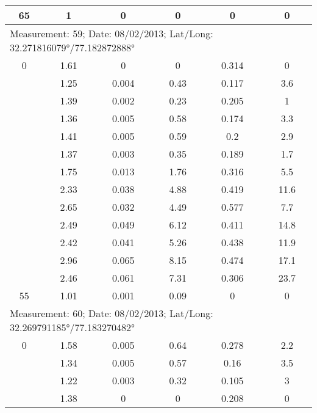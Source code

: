 \begin{longtable}{cccccc}
		65    & 1     & 0     & 0     & 0     & 0 \\
		\midrule
		\multicolumn{6}{l}{Measurement: 59; Date: 08/02/2013;
			Lat/Long: 32.271816079°/77.182872888°} \\		
		\midrule
		0     & 1.61  & 0     & 0     & 0.314 & 0 \\
		
		& 1.25  & 0.004 & 0.43  & 0.117 & 3.6 \\
		
		& 1.39  & 0.002 & 0.23  & 0.205 & 1 \\
		
		& 1.36  & 0.005 & 0.58  & 0.174 & 3.3 \\
		
		& 1.41  & 0.005 & 0.59  & 0.2   & 2.9 \\
		
		& 1.37  & 0.003 & 0.35  & 0.189 & 1.7 \\
		
		& 1.75  & 0.013 & 1.76  & 0.316 & 5.5 \\
		
		& 2.33  & 0.038 & 4.88  & 0.419 & 11.6 \\
		
		& 2.65  & 0.032 & 4.49  & 0.577 & 7.7 \\
		
		& 2.49  & 0.049 & 6.12  & 0.411 & 14.8 \\
		
		& 2.42  & 0.041 & 5.26  & 0.438 & 11.9 \\
		
		& 2.96  & 0.065 & 8.15  & 0.474 & 17.1 \\
		
		& 2.46  & 0.061 & 7.31  & 0.306 & 23.7 \\
		
		55    & 1.01  & 0.001 & 0.09  & 0     & 0 \\
		\midrule
		\multicolumn{6}{l}{Measurement: 60; Date: 08/02/2013;
			Lat/Long: 32.269791185°/77.183270482°} \\		
		\midrule
		0     & 1.58  & 0.005 & 0.64  & 0.278 & 2.2 \\
		
		& 1.34  & 0.005 & 0.57  & 0.16  & 3.5 \\
		
		& 1.22  & 0.003 & 0.32  & 0.105 & 3 \\
		
		& 1.38  & 0     & 0     & 0.208 & 0 \\
		

\end{longtable}
